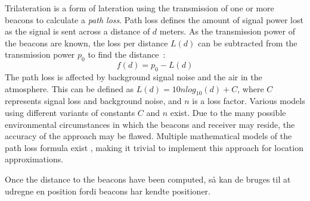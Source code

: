 Trilateration is a form of lateration using the transmission of one or more beacons to calculate a \textit{path loss}.
Path loss defines the amount of signal power lost as the signal is sent across a distance of $d$ meters.
As the transmission power of the beacons are known, the loss per distance $L(d)$ can be subtracted from the transmission power $p_0$ to find the distance~\cite{taking_localization_to_the_wild}:
\begin{equation}\label{distance_equation}
    f(d) = p_0 - L(d)
\end{equation}
The path loss is affected by background signal noise and the air in the atmosphere.
This can be defined as $L(d) = 10n log_{10}(d)+C$, where $C$ represents signal loss and background noise, and $n$ is a loss factor. \cite{taking_localization_to_the_wild}
Various models using different variants of constants $C$ and $n$ exist\cite{path_loss_models}.
Due to the many possible environmental circumstances in which the beacons and receiver may reside, the accuracy of the approach may be flawed\cite{presence_ble_review}. 
Multiple mathematical models of the path loss formula exist \cite{rssi_indoor_pos,positioning_alg_rssi, RSSI_ZigBee_distance}, making it trivial to implement this approach for location approximations.

Once the distance to the beacons have been computed, så kan de bruges til at udregne en position fordi beacons har kendte positioner. 
